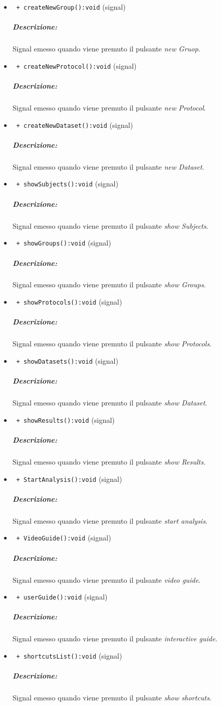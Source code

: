 \begin{itemize}
\item \color{blue}\verb! + createNewGroup():void! (signal)
\color{black} 
\subparagraph{Descrizione:} Signal\g{} emesso quando viene premuto il pulsante \textit{new Gruop}.

\item \color{blue}\verb! + createNewProtocol():void! (signal)
\color{black} 
\subparagraph{Descrizione:} Signal\g{} emesso quando viene premuto il pulsante \textit{new  Protocol}.

\item \color{blue}\verb! + createNewDataset():void! (signal)
\color{black} 
\subparagraph{Descrizione:} Signal\g{} emesso quando viene premuto il pulsante \textit{new Dataset}.

\item \color{blue}\verb! + showSubjects():void! (signal)
\color{black} 
\subparagraph{Descrizione:} Signal\g{} emesso quando viene premuto il pulsante \textit{show Subjects}.

\item \color{blue}\verb! + showGroups():void! (signal)
\color{black} 
\subparagraph{Descrizione:} Signal\g{} emesso quando viene premuto il pulsante \textit{show Groups}.

\item \color{blue}\verb! + showProtocols():void! (signal)
\color{black} 
\subparagraph{Descrizione:} Signal\g{} emesso quando viene premuto il pulsante \textit{show Protocols}.

\item \color{blue}\verb! + showDatasets():void! (signal)
\color{black} 
\subparagraph{Descrizione:} Signal\g{} emesso quando viene premuto il pulsante \textit{show Dataset}.

\item \color{blue}\verb! + showResults():void! (signal)
\color{black} 
\subparagraph{Descrizione:} Signal\g{} emesso quando viene premuto il pulsante \textit{show Results}.

\item \color{blue}\verb! + StartAnalysis():void! (signal)
\color{black} 
\subparagraph{Descrizione:} Signal\g{} emesso quando viene premuto il pulsante \textit{start analysis}.

\item \color{blue}\verb! + VideoGuide():void! (signal)
\color{black} 
\subparagraph{Descrizione:} Signal\g{} emesso quando viene premuto il pulsante \textit{video guide}.

\item \color{blue}\verb! + userGuide():void! (signal)
\color{black} 
\subparagraph{Descrizione:} Signal\g{} emesso quando viene premuto il pulsante \textit{interactive guide}.

\item \color{blue}\verb! + shortcutsList():void! (signal)
\color{black} 
\subparagraph{Descrizione:} Signal\g{} emesso quando viene premuto il pulsante \textit{show shortcuts}.
\end{itemize}
\color{black}
\pagebreak

